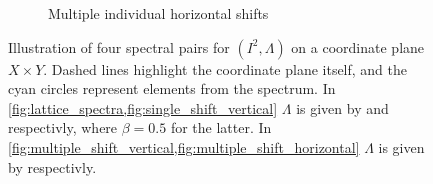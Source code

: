 \begin{figure}[t]
\begin{subfigure}{.47\textwidth}
        \caption{Multiple individual horizontal shifts}
        \label{fig:multiple_shift_horizontal}
    \end{subfigure}
    \label{fig:spectra_figures}
    \caption{Illustration of four spectral pairs for $(I^2,\Lambda)$ on a coordinate plane $X\times Y$. Dashed lines highlight the coordinate plane itself, and the cyan circles represent elements from the spectrum. In \cref{fig:lattice_spectra,fig:single_shift_vertical} $\Lambda$ is given by  and  respectivly, where $\beta=0.5$ for the latter. In \cref{fig:multiple_shift_vertical,fig:multiple_shift_horizontal} $\Lambda$ is given by  respectivly.}
\end{figure}






